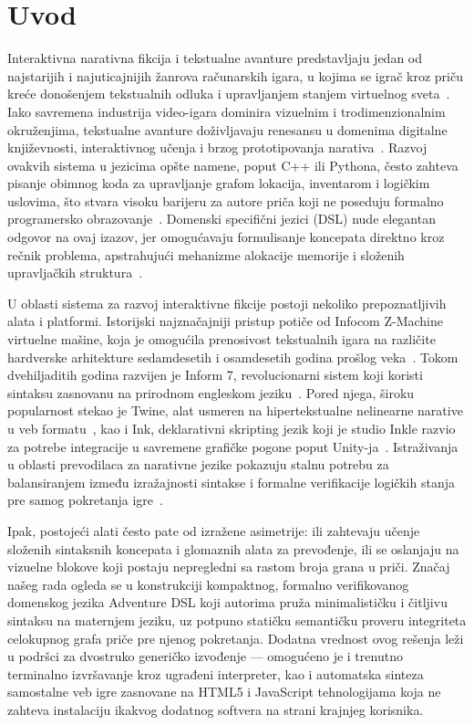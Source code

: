 \documentclass[12pt,a4paper]{article}
\begin{document}
\section{Uvod}
Interaktivna narativna fikcija i tekstualne avanture predstavljaju jedan od najstarijih i najuticajnijih žanrova računarskih igara, u kojima se igrač kroz priču kreće donošenjem tekstualnih odluka i upravljanjem stanjem virtuelnog sveta~\cite{montfort2005twisty}. Iako savremena industrija video-igara dominira vizuelnim i trodimenzionalnim okruženjima, tekstualne avanture doživljavaju renesansu u domenima digitalne književnosti, interaktivnog učenja i brzog prototipovanja narativa~\cite{short2014interactive}. Razvoj ovakvih sistema u jezicima opšte namene, poput C++ ili Pythona, često zahteva pisanje obimnog koda za upravljanje grafom lokacija, inventarom i logičkim uslovima, što stvara visoku barijeru za autore priča koji ne poseduju formalno programersko obrazovanje~\cite{aho2006compilers}. Domenski specifični jezici (DSL) nude elegantan odgovor na ovaj izazov, jer omogućavaju formulisanje koncepata direktno kroz rečnik problema, apstrahujući mehanizme alokacije memorije i složenih upravljačkih struktura~\cite{fowler2010domain}.

U oblasti sistema za razvoj interaktivne fikcije postoji nekoliko prepoznatljivih alata i platformi. Istorijski najznačajniji pristup potiče od Infocom Z-Machine virtuelne mašine, koja je omogućila prenosivost tekstualnih igara na različite hardverske arhitekture sedamdesetih i osamdesetih godina prošlog veka~\cite{nelson2001inform}. Tokom dvehiljaditih godina razvijen je Inform 7, revolucionarni sistem koji koristi sintaksu zasnovanu na prirodnom engleskom jeziku~\cite{nelson2006natural}. Pored njega, široku popularnost stekao je Twine, alat usmeren na hipertekstualne nelinearne narative u veb formatu~\cite{klimas2014twine}, kao i Ink, deklarativni skripting jezik koji je studio Inkle razvio za potrebe integracije u savremene grafičke pogone poput Unity-ja~\cite{inkle2016ink}. Istraživanja u oblasti prevodilaca za narativne jezike pokazuju stalnu potrebu za balansiranjem između izražajnosti sintakse i formalne verifikacije logičkih stanja pre samog pokretanja igre~\cite{wardrip2006expressive}.

Ipak, postojeći alati često pate od izražene asimetrije: ili zahtevaju učenje složenih sintaksnih koncepata i glomaznih alata za prevođenje, ili se oslanjaju na vizuelne blokove koji postaju nepregledni sa rastom broja grana u priči. Značaj našeg rada ogleda se u konstrukciji kompaktnog, formalno verifikovanog domenskog jezika Adventure DSL koji autorima pruža minimalističku i čitljivu sintaksu na maternjem jeziku, uz potpuno statičku semantičku proveru integriteta celokupnog grafa priče pre njenog pokretanja. Dodatna vrednost ovog rešenja leži u podršci za dvostruko generičko izvođenje — omogućeno je i trenutno terminalno izvršavanje kroz ugrađeni interpreter, kao i automatska sinteza samostalne veb igre zasnovane na HTML5 i JavaScript tehnologijama koja ne zahteva instalaciju ikakvog dodatnog softvera na strani krajnjeg korisnika.
\end{document}
